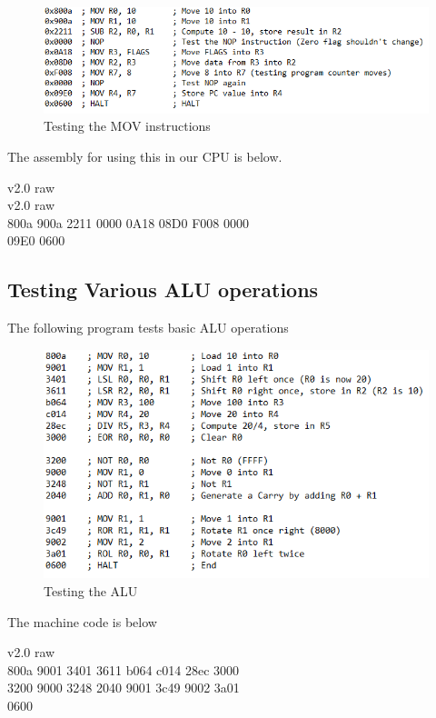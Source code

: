 \documentclass[12pt, letter]{article}
\begin{document}
		\begin{figure}[h]
			\centering
			\includegraphics[scale = 1]{movTest}
			\caption{Testing the MOV instructions}
			\label{fig:moveTest}
		\end{figure}
		The assembly for using this in our CPU is below.\\
		\bigskip
		\begin{tcolorbox}[colback = bg, boxrule = 0pt]
			v2.0 raw\\
			v2.0 raw\\
			800a 
			900a
			2211
			0000
			0A18
			08D0
			F008
			0000\\
			09E0
			0600
		\end{tcolorbox}
	
	\subsection{Testing Various ALU operations}
	The following program tests basic ALU operations
	\newpage
	\begin{figure}[h]
		\centering
		\includegraphics[scale = 1]{aluTest}
		\caption{Testing the ALU}
		\label{fig:aluTest}
	\end{figure}

	The machine code is below
	\begin{tcolorbox}[colback = bg, boxrule = 0pt]
		v2.0 raw\\
		800a 9001 3401 3611 b064 c014 28ec 3000 \\
		3200 9000 3248 2040 9001 3c49 9002 3a01 \\
		0600
	\end{tcolorbox}
\end{document}
